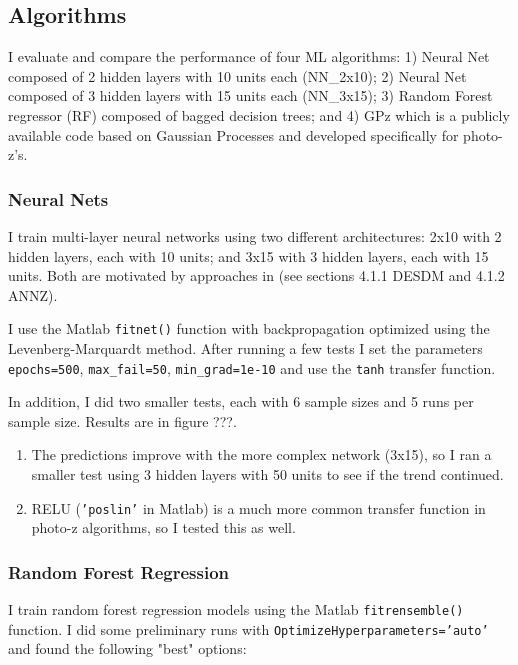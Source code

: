 \documentclass[13pt]{amsart}
\begin{document}
  \subsection{Algorithms}

    I evaluate and compare the performance of four ML algorithms: 1) Neural Net composed of 2 hidden layers with 10 units each (NN\_2x10); 2) Neural Net composed of 3 hidden layers with 15 units each (NN\_3x15); 3) Random Forest regressor (RF) composed of bagged decision trees; and 4) GPz which is a publicly available code based on Gaussian Processes and developed specifically for photo-z's.


    \subsubsection{Neural Nets}

      I train multi-layer neural networks using two different architectures: 2x10 with 2 hidden layers, each with 10 units; and 3x15 with 3 hidden layers, each with 15 units. Both are motivated by approaches in \cite{pzreview} (see sections 4.1.1 DESDM and 4.1.2 ANNZ).

      I use the Matlab \texttt{fitnet()} function with backpropagation optimized using the Levenberg-Marquardt method. After running a few tests I set the parameters \texttt{epochs=500}, \texttt{max\_fail=50}, \texttt{min\_grad=1e-10} and use the \texttt{tanh} transfer function.

      In addition, I did two smaller tests, each with 6 sample sizes and 5 runs per sample size. Results are in figure ???.

      \begin{enumerate}
        \item The predictions improve with the more complex network (3x15), so I ran a smaller test using 3 hidden layers with 50 units to see if the trend continued.

        \item RELU (\texttt{'poslin'} in Matlab) is a much more common transfer function in  photo-z algorithms, so I tested this as well.
      \end{enumerate}


    \subsubsection{Random Forest Regression}

      I train random forest regression models using the Matlab \texttt{fitrensemble()} function. I did some preliminary runs with \texttt{OptimizeHyperparameters='auto'} and found the following "best" options:
\end{document}
